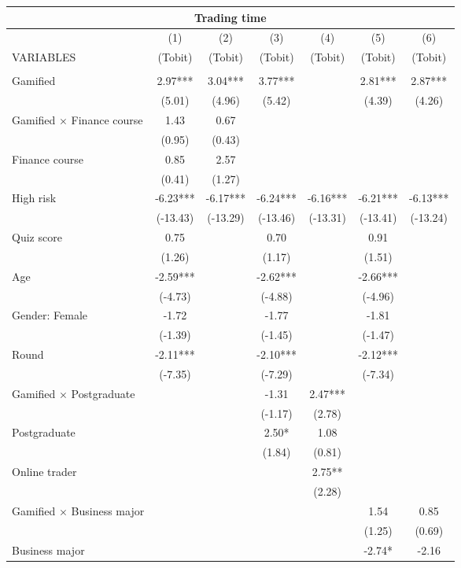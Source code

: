 \documentclass[]{article}
\begin{document}
\begin{tabular}{lcccccc}
\multicolumn{7}{c}{Trading time} \\ \hline
 & (1) & (2) & (3) & (4) & (5) & (6) \\
VARIABLES & (Tobit) & (Tobit) & (Tobit) & (Tobit) & (Tobit) & (Tobit) \\ \hline
 &  &  &  &  &  &  \\
Gamified & 2.97*** & 3.04*** & 3.77*** &  & 2.81*** & 2.87*** \\
 & (5.01) & (4.96) & (5.42) &  & (4.39) & (4.26) \\
Gamified $\times$ Finance course & 1.43 & 0.67 &  &  &  &  \\
 & (0.95) & (0.43) &  &  &  &  \\
Finance course & 0.85 & 2.57 &  &  &  &  \\
 & (0.41) & (1.27) &  &  &  &  \\
High risk & -6.23*** & -6.17*** & -6.24*** & -6.16*** & -6.21*** & -6.13*** \\
 & (-13.43) & (-13.29) & (-13.46) & (-13.31) & (-13.41) & (-13.24) \\
Quiz score & 0.75 &  & 0.70 &  & 0.91 &  \\
 & (1.26) &  & (1.17) &  & (1.51) &  \\
Age & -2.59*** &  & -2.62*** &  & -2.66*** &  \\
 & (-4.73) &  & (-4.88) &  & (-4.96) &  \\
Gender: Female & -1.72 &  & -1.77 &  & -1.81 &  \\
 & (-1.39) &  & (-1.45) &  & (-1.47) &  \\
Round & -2.11*** &  & -2.10*** &  & -2.12*** &  \\
 & (-7.35) &  & (-7.29) &  & (-7.34) &  \\
Gamified $\times$ Postgraduate &  &  & -1.31 & 2.47*** &  &  \\
 &  &  & (-1.17) & (2.78) &  &  \\
Postgraduate &  &  & 2.50* & 1.08 &  &  \\
 &  &  & (1.84) & (0.81) &  &  \\
Online trader &  &  &  & 2.75** &  &  \\
 &  &  &  & (2.28) &  &  \\
Gamified $\times$ Business major &  &  &  &  & 1.54 & 0.85 \\
 &  &  &  &  & (1.25) & (0.69) \\
Business major &  &  &  &  & -2.74* & -2.16 \\

\end{tabular}
\end{document}
